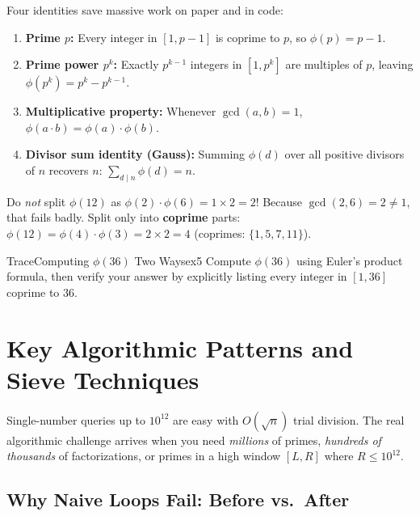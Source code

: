 \documentclass[11pt,a4paper]{article}
\theoremstyle{definition}
\begin{document}
Four identities save massive work on paper and in code:
\begin{enumerate}
    \item \textbf{Prime $p$:} Every integer in $[1, p - 1]$ is coprime to $p$, so $\phi(p) = p - 1$.
    \item \textbf{Prime power $p^k$:} Exactly $p^{k-1}$ integers in $[1, p^k]$ are multiples of $p$, leaving $\phi(p^k) = p^k - p^{k-1}$.
    \item \textbf{Multiplicative property:} Whenever $\gcd(a, b) = 1$, $\phi(a \cdot b) = \phi(a) \cdot \phi(b)$.
    \item \textbf{Divisor sum identity (Gauss):} Summing $\phi(d)$ over all positive divisors of $n$ recovers $n$: $\sum_{d \mid n} \phi(d) = n$.
\end{enumerate}

\begin{watchoutbox}[Watch Out --- Multiplicativity Requires $\gcd(a, b) = 1$]
Do \emph{not} split $\phi(12)$ as $\phi(2) \cdot \phi(6) = 1 \times 2 = 2$! Because $\gcd(2, 6) = 2 \neq 1$, that fails badly. Split only into \textbf{coprime} parts: $\phi(12) = \phi(4) \cdot \phi(3) = 2 \times 2 = 4$ (coprimes: $\{1, 5, 7, 11\}$).
\end{watchoutbox}

\begin{tryitbox}{Trace}{Computing $\phi(36)$ Two Ways}{ex5}
Compute $\phi(36)$ using Euler's product formula, then verify your answer by explicitly listing every integer in $[1, 36]$ coprime to $36$.
\end{tryitbox}

\section{Key Algorithmic Patterns and Sieve Techniques}

Single-number queries up to $10^{12}$ are easy with $O(\sqrt{n})$ trial division. The real algorithmic challenge arrives when you need \emph{millions} of primes, \emph{hundreds of thousands} of factorizations, or primes in a high window $[L, R]$ where $R \le 10^{12}$.

\subsection{Why Naive Loops Fail: Before vs.\ After}
\end{document}
